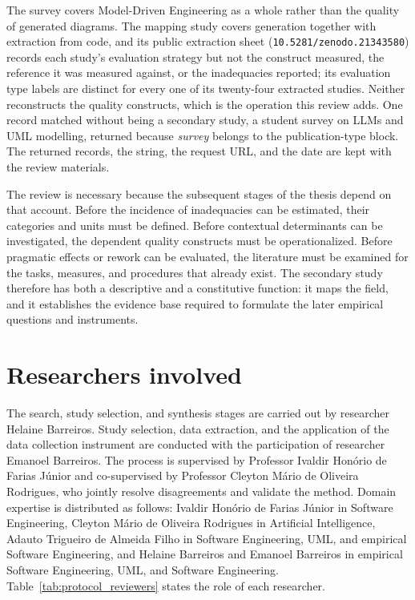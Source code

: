 The survey covers Model-Driven Engineering as a whole rather than the quality of generated diagrams. The mapping study covers generation together with extraction from code, and its public extraction sheet (\texttt{10.5281/zenodo.21343580}) records each study's evaluation strategy but not the construct measured, the reference it was measured against, or the inadequacies reported; its evaluation type labels are distinct for every one of its twenty-four extracted studies. Neither reconstructs the quality constructs, which is the operation this review adds. One record matched without being a secondary study, a student survey on LLMs and UML modelling, returned because \textit{survey} belongs to the publication-type block. The returned records, the string, the request URL, and the date are kept with the review materials.

The review is necessary because the subsequent stages of the thesis depend on that account. Before the incidence of inadequacies can be estimated, their categories and units must be defined. Before contextual determinants can be investigated, the dependent quality constructs must be operationalized. Before pragmatic effects or rework can be evaluated, the literature must be examined for the tasks, measures, and procedures that already exist. The secondary study therefore has both a descriptive and a constitutive function: it maps the field, and it establishes the evidence base required to formulate the later empirical questions and instruments.

\section{Researchers involved}
\label{sec:protocol_reviewers}

The search, study selection, and synthesis stages are carried out by researcher Helaine Barreiros. Study selection, data extraction, and the application of the data collection instrument are conducted with the participation of researcher Emanoel Barreiros. The process is supervised by Professor Ivaldir Hon\'orio de Farias J\'unior and co-supervised by Professor Cleyton M\'ario de Oliveira Rodrigues, who jointly resolve disagreements and validate the method. Domain expertise is distributed as follows: Ivaldir Hon\'orio de Farias J\'unior in Software Engineering, Cleyton M\'ario de Oliveira Rodrigues in Artificial Intelligence, Adauto Trigueiro de Almeida Filho in Software Engineering, UML, and empirical Software Engineering, and Helaine Barreiros and Emanoel Barreiros in empirical Software Engineering, UML, and Software Engineering. Table~\ref{tab:protocol_reviewers} states the role of each researcher.

